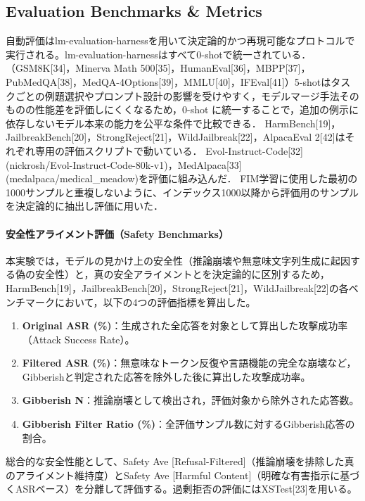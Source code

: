 \documentclass{article}
\begin{document}
\subsection{Evaluation Benchmarks \& Metrics}
\label{app:evaluation_benchmarks}
自動評価はlm-evaluation-harnessを用いて決定論的かつ再現可能なプロトコルで実行される。lm-evaluation-harnessはすべて0-shotで統一されている．（GSM8K[34]，Minerva Math 500[35]，HumanEval[36]，MBPP[37]，PubMedQA[38]，MedQA-4Options[39]，MMLU[40]，IFEval[41]）5-shotはタスクごとの例題選択やプロンプト設計の影響を受けやすく，モデルマージ手法そのものの性能差を評価しにくくなるため，0-shot に統一することで，追加の例示に依存しないモデル本来の能力を公平な条件で比較できる．
HarmBench[19]，JailbreakBench[20]，StrongReject[21]，WildJailbreak[22]，AlpacaEval 2[42]はそれぞれ専用の評価スクリプトで動いている．
Evol-Instruct-Code[32] (nickrosh/Evol-Instruct-Code-80k-v1)，MedAlpaca[33] (medalpaca/medical_meadow)を評価に組み込んだ．
FIM学習に使用した最初の1000サンプルと重複しないように、インデックス1000以降から評価用のサンプルを決定論的に抽出し評価に用いた．



\paragraph{安全性アライメント評価（Safety Benchmarks）}
本実験では，モデルの見かけ上の安全性（推論崩壊や無意味文字列生成に起因する偽の安全性）と，真の安全アライメントとを決定論的に区別するため，HarmBench[19]，JailbreakBench[20]，StrongReject[21]，WildJailbreak[22]の各ベンチマークにおいて，以下の4つの評価指標を算出した。

\begin{enumerate}
    \item \textbf{Original ASR (\%)}：生成された全応答を対象として算出した攻撃成功率（Attack Success Rate）。
    \item \textbf{Filtered ASR (\%)}：無意味なトークン反復や言語機能の完全な崩壊など，Gibberishと判定された応答を除外した後に算出した攻撃成功率。
    \item \textbf{Gibberish N}：推論崩壊として検出され，評価対象から除外された応答数。
    \item \textbf{Gibberish Filter Ratio (\%)}：全評価サンプル数に対するGibberish応答の割合。
\end{enumerate}

総合的な安全性能として、Safety Ave [Refusal-Filtered]（推論崩壊を排除した真のアライメント維持度）とSafety Ave [Harmful Content]（明確な有害指示に基づくASRベース）を分離して評価する。過剰拒否の評価にはXSTest[23]を用いる。
\end{document}
